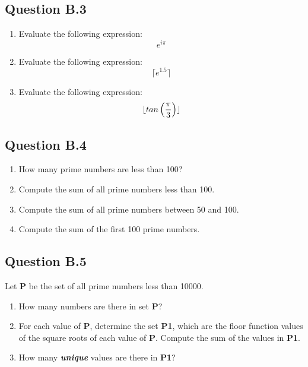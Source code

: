 \documentclass[12pt]{article}
\begin{document}
\subsection*{Question B.3}  %
\begin{enumerate}
\item Evaluate the following expression:
{\Large \[ e^{i \pi} \]}
\item Evaluate the following expression:
{\Large \[ \lceil e^{1.5} \rceil \]}
\item Evaluate the following expression:
\[ {\LARGE \lfloor  tan \left( \frac{\pi}{3} \right) \rfloor  }\]
\end{enumerate}
\subsection*{Question B.4}
\begin{enumerate}
\item How many prime numbers are less than 100?
\item Compute the sum of all prime numbers less than 100.
\item Compute the sum of all prime numbers between 50 and 100.
\item Compute the sum of the first 100 prime numbers.
\end{enumerate}

\subsection*{Question B.5}
Let \textbf{P} be the set of all prime numbers less than 10000.
\begin{enumerate}
\item How many numbers are there in set \textbf{P}?
\item For each value of \textbf{P}, determine the set \textbf{P1}, which are the floor function values of the square roots of each value of \textbf{P}. Compute the sum of the values in \textbf{P1}.
\item How many \textbf{\textit{unique}} values are there in \textbf{P1}?
\end{enumerate}
\end{document}

